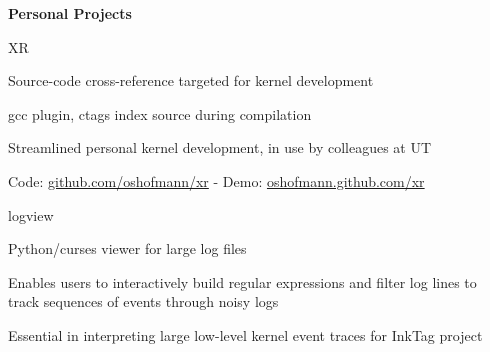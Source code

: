 \bigskip

{\bf Personal Projects}
\begin{outerlist}

\item[] %
    \begin{innerlist}
        \item XR
        \begin{innerlist}
           \item Source-code cross-reference targeted for kernel
development
           \item gcc plugin, ctags index source during compilation
           \item Streamlined personal kernel development, in use by
colleagues at UT
           \item Code:
\href{http://github.com/oshofmann/xr}{github.com/oshofmann/xr}
           - Demo: \href{http://oshofmann.github.com/xr}{oshofmann.github.com/xr}
        \end{innerlist}
     \end{innerlist}

\item[] %
    \begin{innerlist}
        \item logview
        \begin{innerlist}
           \item Python/curses viewer for large log files
           \item Enables users to interactively build regular expressions
and filter log lines to track sequences of events through noisy logs
           \item Essential in interpreting large low-level kernel event
traces for InkTag project
        \end{innerlist}
     \end{innerlist}
\end{outerlist}
